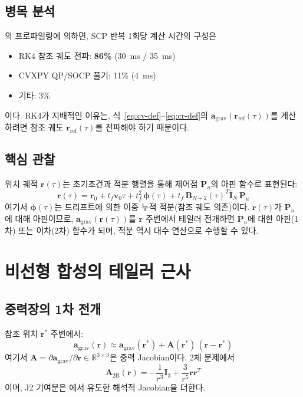 \documentclass[11pt]{article}
\begin{document}
\subsection{병목 분석}

\cite{report008}의 프로파일링에 의하면, SCP 반복 1회당 계산 시간의 구성은
\begin{itemize}
  \item RK4 참조 궤도 전파: \textbf{86\%} (\SI{30}{\ms} / \SI{35}{\ms})
  \item CVXPY QP/SOCP 풀기: 11\% (\SI{4}{\ms})
  \item 기타: 3\%
\end{itemize}
이다. RK4가 지배적인 이유는, 식~\eqref{eq:cv-def}--\eqref{eq:cr-def}의
$\mathbf{a}_\text{grav}(\mathbf{r}_\text{ref}(\tau))$를 계산하려면
참조 궤도 $\mathbf{r}_\text{ref}(\tau)$를 전파해야 하기 때문이다.

\subsection{핵심 관찰}

위치 궤적 $\mathbf{r}(\tau)$는 초기조건과 적분 행렬을 통해
제어점 $\mathbf{P}_u$의 아핀 함수로 표현된다:
\begin{equation}
  \mathbf{r}(\tau) = \mathbf{r}_0 + t_f \mathbf{v}_0 \tau
    + t_f^2 \,\boldsymbol{\phi}(\tau)
    + t_f \, \mathbf{B}_{N+2}(\tau)^T \bar{\mathbf{I}}_N \, \mathbf{P}_u
  \label{eq:r-of-tau}
\end{equation}
여기서 $\boldsymbol{\phi}(\tau)$는 드리프트에 의한 이중 누적 적분(참조 궤도 의존)이다.
$\mathbf{r}(\tau)$가 $\mathbf{P}_u$에 대해 아핀이므로,
$\mathbf{a}_\text{grav}(\mathbf{r}(\tau))$를 $\mathbf{r}$ 주변에서
테일러 전개하면 $\mathbf{P}_u$에 대한 아핀(1차) 또는 이차(2차) 함수가 되며,
적분 역시 대수 연산으로 수행할 수 있다.

\section{비선형 합성의 테일러 근사}
\label{sec:taylor}

\subsection{중력장의 1차 전개}

참조 위치 $\mathbf{r}^*$ 주변에서:
\begin{equation}
  \mathbf{a}_\text{grav}(\mathbf{r}) \approx
    \mathbf{a}_\text{grav}(\mathbf{r}^*)
    + \mathbf{A}(\mathbf{r}^*)\,(\mathbf{r} - \mathbf{r}^*)
  \label{eq:taylor1}
\end{equation}
여기서 $\mathbf{A} = \partial \mathbf{a}_\text{grav}/\partial \mathbf{r} \in \mathbb{R}^{3\times 3}$은
중력 Jacobian이다.
2체 문제에서
\begin{equation}
  \mathbf{A}_\text{2B}(\mathbf{r}) = -\frac{1}{r^3}\mathbf{I}_3
    + \frac{3}{r^5}\mathbf{r}\mathbf{r}^T
\end{equation}
이며, J2 기여분은 \cite{report002}에서 유도한 해석적 Jacobian을 더한다.
\end{document}

